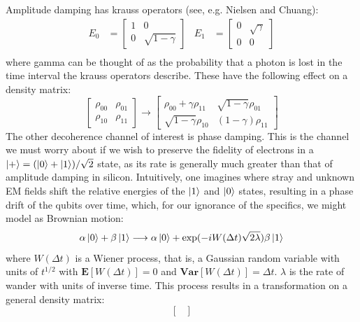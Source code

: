 \documentclass{report}
\begin{document}
\begin{appendices}
Amplitude damping has krauss operators (see, e.g. Nielsen and Chuang):
\begin{align*}
E_0 &= \begin{bmatrix}
1 & 0\\
0 & \sqrt{1-\gamma} 
\end{bmatrix}   &   E_1 &= \begin{bmatrix}
0 & \sqrt{\gamma}\\
0 & 0 
\end{bmatrix}\\
\end{align*}
where gamma can be thought of as the probability that a photon is lost in the time interval the krauss operators describe. These have the following effect on a density matrix:
\begin{equation*}
    \begin{bmatrix}
        \rho_{00} & \rho_{01} \\ \rho_{10} & \rho_{11}
    \end{bmatrix}
    \longrightarrow
    \begin{bmatrix}
        \rho_{00} + \gamma \rho_{11} & \sqrt{1-\gamma} \rho_{01} \\ \sqrt{1-\gamma} \rho_{10} & (1-\gamma) \rho_{11}
    \end{bmatrix}
\end{equation*}
The other decoherence channel of interest is phase damping. This is the channel we must worry about if we wish to preserve the fidelity of electrons in a $\ket{+} = (\ket{0} + \ket{1})/\sqrt{2}$ state, as its rate is generally much greater than that of amplitude damping in silicon. Intuitively, one imagines where stray and unknown EM fields shift the relative energies of the $\ket{1}$ and $\ket{0}$ states, resulting in a phase drift of the qubits over time, which, for our ignorance of the specifics, we might model as Brownian motion:
\begin{equation*}
\alpha\ket{0} + \beta\ket{1} \longrightarrow \alpha\ket{0} + \exp(-i W(\Delta t) \sqrt{2\lambda}) \beta\ket{1}
\end{equation*}
where $W(\Delta t)$ is a Wiener process, that is, a Gaussian random variable with units of $t^{1/2}$ with $\mathbf{E}[W(\Delta t)] = 0$ and $\mathbf{Var}[W(\Delta t)] = \Delta t$. $\lambda$ is the rate of wander with units of inverse time. This process results in a transformation on a general density matrix:
\begin{equation} \label{eq:phasedamptrans}
    \begin{bmatrix}

\end{bmatrix}
\end{equation}
\end{appendices}
\end{document}
